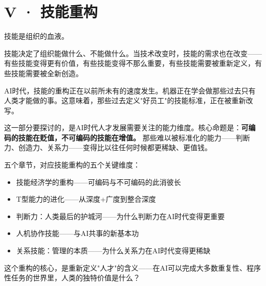 \part{V · 技能重构}



技能是组织的血液。

技能决定了组织能做什么、不能做什么。当技术改变时，技能的需求也在改变——有些技能变得更有价值，有些技能变得不那么重要，有些技能需要被重新定义，有些技能需要被全新创造。

AI时代，技能的重构正在以前所未有的速度发生。机器正在学会做那些过去只有人类才能做的事。这意味着，那些过去定义"好员工"的技能标准，正在被重新改写。

这一部分要探讨的，是AI时代人才发展需要关注的能力维度。核心命题是：\textbf{可编码的技能在贬值，不可编码的技能在增值。} 那些难以被标准化的能力——判断力、创造力、关系力——变得比以往任何时候都更稀缺、更值钱。

五个章节，对应技能重构的五个关键维度：
\begin{itemize}
\item 技能经济学的重构——可编码与不可编码的此消彼长
\item T型能力的进化——从深度+广度到整合深度
\item 判断力：人类最后的护城河——为什么判断力在AI时代变得更重要
\item 人机协作技能——与AI共事的新基本功
\item 关系技能：管理的本质——为什么关系力在AI时代变得更稀缺

\end{itemize}
这个重构的核心，是重新定义"人才"的含义——在AI可以完成大多数重复性、程序性任务的世界里，人类的独特价值是什么？

